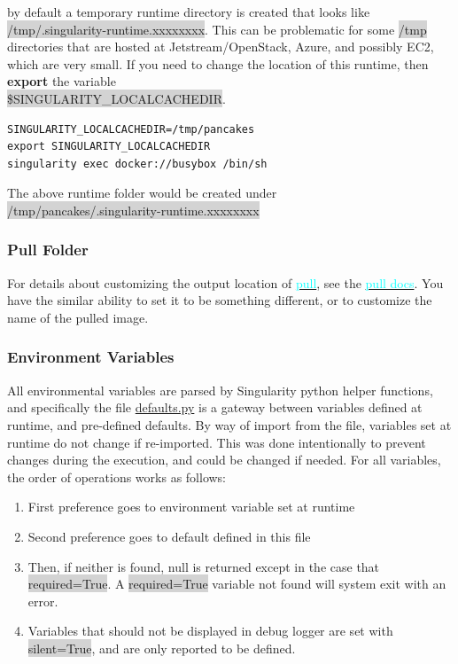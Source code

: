 \documentclass[a4paper]{article}
\begin{document}
by default a temporary runtime directory is created that looks like \colorbox{lightgray}{/tmp/.singularity-runtime.xxxxxxxx}. This can be problematic for some \colorbox{lightgray}{/tmp} directories that are hosted at Jetstream/OpenStack, Azure, and possibly EC2, which are very small. If you need to change the location of this runtime, then \textbf{export} the variable\\ \colorbox{lightgray}{\$SINGULARITY\_LOCALCACHEDIR}.

\begin{lstlisting}[frame=single]
SINGULARITY_LOCALCACHEDIR=/tmp/pancakes
export SINGULARITY_LOCALCACHEDIR
singularity exec docker://busybox /bin/sh
\end{lstlisting}

The above runtime folder would be created under\\[0.1in]
\colorbox{lightgray}{/tmp/pancakes/.singularity-runtime.xxxxxxxx}

\subsubsection{Pull Folder}

For details about customizing the output location of 
\hyperref[sec:pull]{{\textcolor{cyan}{pull}}}, see the 
\hyperref[sec:pull]{{\textcolor{cyan}{pull docs}}}. You have the similar ability to set it to be something different, or to customize the name of the pulled image.


\subsubsection{Environment Variables}

All environmental variables are parsed by Singularity python helper functions, and specifically the file \href{https://github.com/singularityware/singularity/blob/master/libexec/python/defaults.py}{defaults.py} is a gateway between variables defined at runtime, and pre-defined defaults. By way of import from the file, variables set at runtime do not change if re-imported. This was done intentionally to prevent changes during the execution, and could be changed if needed. For all variables, the order of operations works as follows:\\
\begin{enumerate}
\item First preference goes to environment variable set at runtime
\item Second preference goes to default defined in this file
\item Then, if neither is found, null is returned except in the case that \colorbox{lightgray}{required=True}. A \colorbox{lightgray}{required=True} variable not found will system exit with an error.
\item Variables that should not be displayed in debug logger are set with \colorbox{lightgray}{silent=True}, and are only reported to be defined.
\end{enumerate}
\end{document}
